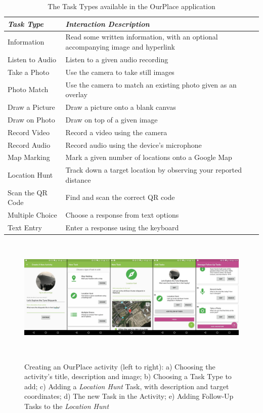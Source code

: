 \documentclass[,hyphens]{sigchi}
\begin{document}
\begin{table}
  \centering
  \begin{tabular}{l|p{60mm}}
    {\small\textit{Task Type}}
    & {\small \textit{Interaction Description}} \\
    \midrule
    \small Information & \small Read some written information, with an optional accompanying image and hyperlink \\
    \small Listen to Audio & \small Listen to a given audio recording \\
    \small Take a Photo & \small Use the camera to take still images \\
    \small Photo Match & \small Use the camera to match an existing photo given as an overlay \\
    \small Draw a Picture & \small Draw a picture onto a blank canvas \\
    \small Draw on Photo & \small Draw on top of a given image \\
    \small Record Video & \small Record a video using the camera \\
    \small Record Audio & \small Record audio using the device's microphone \\
    \small Map Marking & \small Mark a given number of locations onto a Google Map \\
    \small Location Hunt & \small Track down a target location by observing your reported distance \\
    \small Scan the QR Code & \small Find and scan the correct QR code \\
    \small Multiple Choice & \small Choose a response from text options \\
    \small Text Entry & \small Enter a response using the keyboard
  \end{tabular}
  \caption{The Task Types available in the OurPlace application}~\label{tab:TaskTypes}
\end{table}

\begin{figure}
  \centering
  \includegraphics[width=2.1\columnwidth]{figures/activityCreation}
  \caption{Creating an OurPlace activity (left to right): a) Choosing the activity's title, description and image; b) Choosing a Task Type to add; c) Adding a \textit{Location Hunt} Task, with description and target coordinates; d) The new Task in the Activity; e) Adding Follow-Up Tasks to the \textit{Location Hunt}  }~\label{fig:ActivityCreation}
\end{figure}
\end{document}
